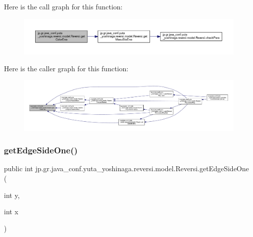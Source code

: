 Here is the call graph for this function\+:
\nopagebreak
\begin{figure}[H]
\begin{center}
\leavevmode
\includegraphics[width=350pt]{classjp_1_1gr_1_1java__conf_1_1yuta__yoshinaga_1_1reversi_1_1model_1_1_reversi_ac6fafa41eeff56abfc67b2b5876b50f9_cgraph}
\end{center}
\end{figure}
Here is the caller graph for this function\+:
\nopagebreak
\begin{figure}[H]
\begin{center}
\leavevmode
\includegraphics[width=350pt]{classjp_1_1gr_1_1java__conf_1_1yuta__yoshinaga_1_1reversi_1_1model_1_1_reversi_ac6fafa41eeff56abfc67b2b5876b50f9_icgraph}
\end{center}
\end{figure}
\mbox{\label{classjp_1_1gr_1_1java__conf_1_1yuta__yoshinaga_1_1reversi_1_1model_1_1_reversi_aa3c701584a82e4656cb1c60123454953}} 
\subsubsection{\texorpdfstring{get\+Edge\+Side\+One()}{getEdgeSideOne()}}
{\footnotesize\ttfamily public int jp.\+gr.\+java\+\_\+conf.\+yuta\+\_\+yoshinaga.\+reversi.\+model.\+Reversi.\+get\+Edge\+Side\+One (\begin{DoxyParamCaption}\item[{int}]{y,  }\item[{int}]{x }\end{DoxyParamCaption})}



